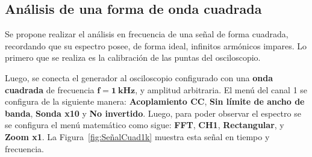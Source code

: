   \subsection{Análisis de una forma de onda cuadrada}
    Se propone realizar el análisis en frecuencia de una señal de forma cuadrada, recordando que
    su espectro posee, de forma ideal, infinitos armónicos impares. Lo primero que se realiza es 
    la calibración de las puntas del osciloscopio.

    Luego, se conecta el generador al osciloscopio configurado con una \textbf{onda cuadrada} de
    frecuencia $\mathbf{f=1~kHz}$, y amplitud arbitraria. El menú del canal 1 se configura de la
    siguiente manera: \textbf{Acoplamiento CC}, \textbf{Sin límite de ancho de banda},
    \textbf{Sonda x10} y \textbf{No invertido}. Luego, para poder observar el espectro se
    se configura el menú matemático como sigue: \textbf{FFT}, \textbf{CH1}, \textbf{Rectangular},
    y \textbf{Zoom x1}. La Figura~\ref{fig:SeñalCuad1k} muestra esta señal en tiempo y frecuencia.

